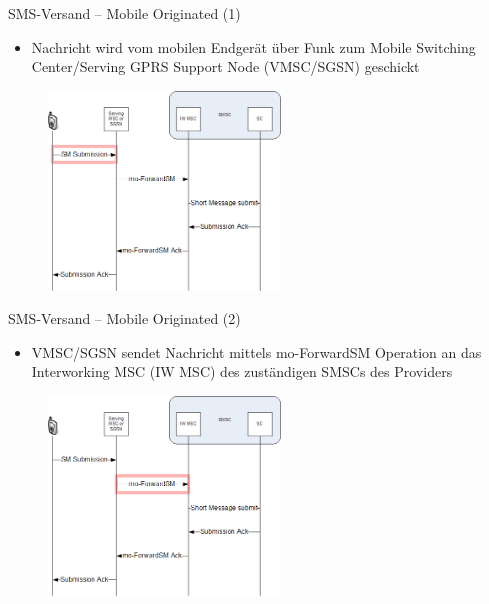 \documentclass{beamer}
\begin{document}
\begin{frame}{SMS-Versand -- Mobile Originated (1)}

	\begin{itemize}
		\item Nachricht wird vom mobilen Endgerät über Funk zum Mobile Switching 
			Center/Serving GPRS Support Node (VMSC/SGSN) geschickt
	\end{itemize}
	\begin{figure}[htm]
		\includegraphics[width=0.55\textwidth]{img/mo-forward-sm-1.png}
	\end{figure}	
\end{frame}

\begin{frame}{SMS-Versand -- Mobile Originated (2)}

	\begin{itemize}
		\item VMSC/SGSN sendet Nachricht mittels mo-ForwardSM Operation an das Interworking MSC (IW MSC)
			des zuständigen SMSCs des Providers
	\end{itemize}
	\begin{figure}[htm]
		\includegraphics[width=0.55\textwidth]{img/mo-forward-sm-2.png}
	\end{figure}	
\end{frame}
\end{document}
